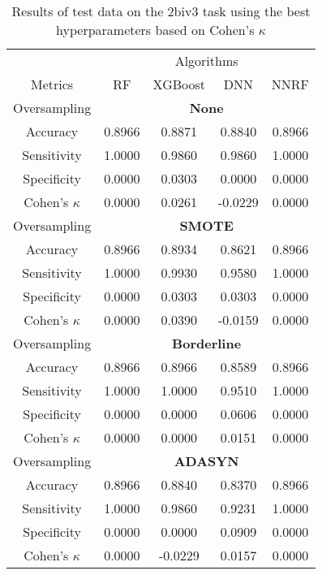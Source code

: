 \begin{table}[!htb]
\centering
\caption{Results of test data on the 2biv3 task using the best hyperparameters based on Cohen's $\kappa$}
\label{tab:2biv3_test_results}
\begin{tabular}{c | c c c c}
\hline
 & \multicolumn{4}{c}{Algorithms}\\ 
Metrics &RF & XGBoost & DNN & NNRF\\ 
\hline
Oversampling &\multicolumn{4}{|c}{\textbf{None}}\\ 
\hline
Accuracy & 0.8966 & 0.8871 & 0.8840 & 0.8966\\ 
Sensitivity & 1.0000 & 0.9860 & 0.9860 & 1.0000\\ 
Specificity & 0.0000 & 0.0303 & 0.0000 & 0.0000\\ 
Cohen's $\kappa$ & 0.0000 & 0.0261 & -0.0229 & 0.0000\\ 
\hline
Oversampling &\multicolumn{4}{|c}{\textbf{SMOTE}}\\ 
\hline
Accuracy & 0.8966 & 0.8934 & 0.8621 & 0.8966\\ 
Sensitivity & 1.0000 & 0.9930 & 0.9580 & 1.0000\\ 
Specificity & 0.0000 & 0.0303 & 0.0303 & 0.0000\\ 
Cohen's $\kappa$ & 0.0000 & 0.0390 & -0.0159 & 0.0000\\ 
\hline
Oversampling &\multicolumn{4}{|c}{\textbf{Borderline}}\\ 
\hline
Accuracy & 0.8966 & 0.8966 & 0.8589 & 0.8966\\ 
Sensitivity & 1.0000 & 1.0000 & 0.9510 & 1.0000\\ 
Specificity & 0.0000 & 0.0000 & 0.0606 & 0.0000\\ 
Cohen's $\kappa$ & 0.0000 & 0.0000 & 0.0151 & 0.0000\\ 
\hline
Oversampling &\multicolumn{4}{|c}{\textbf{ADASYN}}\\ 
\hline
Accuracy & 0.8966 & 0.8840 & 0.8370 & 0.8966\\ 
Sensitivity & 1.0000 & 0.9860 & 0.9231 & 1.0000\\ 
Specificity & 0.0000 & 0.0000 & 0.0909 & 0.0000\\ 
Cohen's $\kappa$ & 0.0000 & -0.0229 & 0.0157 & 0.0000\\ 
\hline
\end{tabular}
\end{table}

